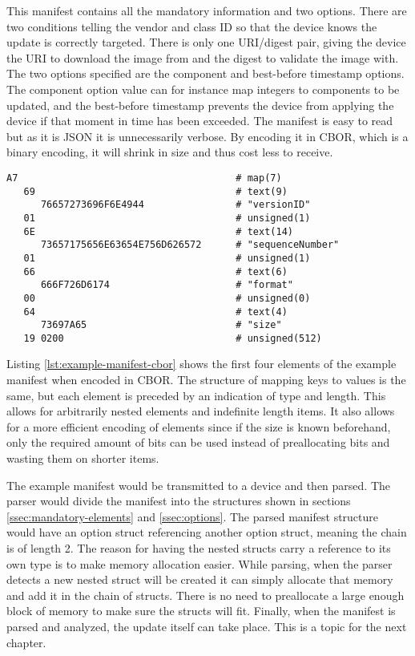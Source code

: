 \documentclass[0-thesis.tex]{subfiles}
\begin{document}
This manifest contains all the mandatory information and two options. There are two
conditions telling the vendor and class ID so that the device knows the update is
correctly targeted. There is only one URI/digest pair, giving the device the URI to
download the image from and the digest to validate the image with. The two options
specified are the component and best-before timestamp options. The component option value
can for instance map integers to components to be updated, and the best-before timestamp
prevents the device from applying the device if that moment in time has been exceeded. The
manifest is easy to read but as it is JSON it is unnecessarily verbose. By encoding it in
CBOR, which is a binary encoding, it will shrink in size and thus cost less to receive.

\begin{lstlisting}[language=blockjson,
                    caption={The first four elements of the example manifest in CBOR encoding.},
                    label={lst:example-manifest-cbor}]
A7                                      # map(7)
   69                                   # text(9)
      76657273696F6E4944                # "versionID"
   01                                   # unsigned(1)
   6E                                   # text(14)
      73657175656E63654E756D626572      # "sequenceNumber"
   01                                   # unsigned(1)
   66                                   # text(6)
      666F726D6174                      # "format"
   00                                   # unsigned(0)
   64                                   # text(4)
      73697A65                          # "size"
   19 0200                              # unsigned(512)
\end{lstlisting}

Listing \ref{lst:example-manifest-cbor} shows the first four elements of the example
manifest when encoded in CBOR. The structure of mapping keys to values is the same, but
each element is preceded by an indication of type and length. This allows for arbitrarily
nested elements and indefinite length items. It also allows for a more efficient encoding
of elements since if the size is known beforehand, only the required amount of bits can be
used instead of preallocating bits and wasting them on shorter items.

The example manifest would be transmitted to a device and then parsed. The parser would
divide the manifest into the structures shown in sections \ref{ssec:mandatory-elements}
and \ref{ssec:options}. The parsed manifest structure would have an option struct
referencing another option struct, meaning the chain is of length 2. The reason for having
the nested structs carry a reference to its own type is to make memory allocation easier.
While parsing, when the parser detects a new nested struct will be created it can simply
allocate that memory and add it in the chain of structs. There is no need to preallocate a
large enough block of memory to make sure the structs will fit. Finally, when the manifest
is parsed and analyzed, the update itself can take place. This is a topic for the next
chapter.
\end{document}
